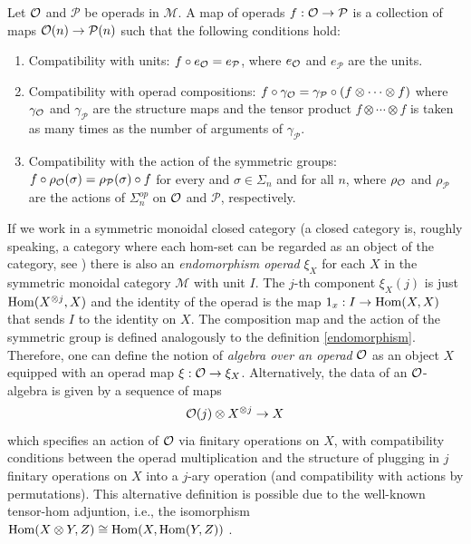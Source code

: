 \documentclass[TFM.tex]{subfiles}
\begin{document}
\begin{defi}
Let ${\mathcal O}$ and $\mathcal{P}$ be operads in $\mathscr{M}$. A map of operads $f:{\mathcal O}\to \mathcal{P}$ is a collection of maps ${\mathcal O}(n)\to \mathcal{P}(n)$ such that the following conditions hold:
\begin{enumerate}
\item Compatibility with units:  $f\circ e_{\mathcal O}=e_\mathcal{P}$, where $e_{\mathcal O}$ and $e_\mathcal{P}$ are the units.
\item Compatibility with operad compositions: $f\circ \gamma_{\mathcal O}=\gamma_\mathcal{P}\circ (f\otimes\cdots\otimes f)$ where $\gamma_{\mathcal O}$ and $\gamma_\mathcal{P}$ are the structure maps and the tensor product $f\otimes\cdots\otimes f$ is taken as many times as the number of arguments of $\gamma_\mathcal{P}$. 
\item  Compatibility with the action of the symmetric groups: $f\circ \rho_{\mathcal O}(\sigma)=\rho_\mathcal{P}(\sigma)\circ f$ for every and $\sigma\in\Sigma_n$ and for all $n$, where $\rho_{\mathcal O}$ and $\rho_\mathcal{P}$ are the actions of $\Sigma_n^{op}$ on ${\mathcal O}$ and $\mathcal{P}$, respectively.
\end{enumerate}
\end{defi}



If we work in a symmetric monoidal closed category (a closed category is, roughly speaking, a category where each hom-set can be regarded as an object of the category, see \cite[]{handbook}) there is also an \emph{endomorphism operad} $\xi_X$ for each $X$ in the symmetric monoidal category $\mathscr{M}$ with unit $I$. The $j$-th component $\xi_X(j)$ is just $\operatorname{Hom}(X^{\otimes j},X)$ and the identity of the operad is the map $1_x:I\to \operatorname{Hom}(X,X)$ that sends $I$ to the identity on $X$. The composition map and the action of the symmetric group is defined analogously to the definition \ref{endomorphism}. Therefore, one can define the notion of \emph{algebra over an operad} ${\mathcal O}$ as an object $X$ equipped with an operad map $\xi:{\mathcal O}\to\xi_X$. Alternatively, the data of an ${\mathcal O}$-algebra is given by a sequence of maps
\[
{\mathcal O}(j) \otimes X^{\otimes j} \to X
\]
which specifies an action of ${\mathcal O}$ via finitary operations on $X$, with compatibility conditions between the operad multiplication and the structure of plugging in $j$ finitary operations on $X$ into a $j$-ary operation (and compatibility with actions by permutations). This alternative definition is possible due to the well-known tensor-hom adjuntion, i.e., the isomorphism $\operatorname{Hom}(X\otimes Y,Z)\cong \operatorname{Hom}(X,\operatorname{Hom}(Y,Z))$ \cite{tensor-hom}. 
\end{document}
